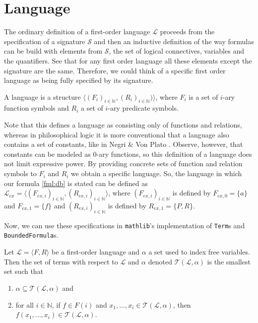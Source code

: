 \section{Language}\label{subsec:language}
The ordinary definition of a first-order language $\mathcal{L}$ proceeds from the specification of a signature $\mathcal{S}$ and then an inductive definition of the way formulas can be build with elements from $\mathcal{S}$, the set of logical connectives, variables and the quantifiers. See that for any first order language all these elements except the signature are the same. Therefore, we could think of a specific first order language as being fully specified by its signature.

\begin{definition}\label{def:FO-Language}
\leanok
  A language is a structure $\langle(F_i)_{i\in \mathbb{N}}, (R_i)_{i\in \mathbb{N}})\rangle$, where $F_i$ is a set of $i$-ary function symbols and $R_i$ a set of $i$-ary predicate symbols.
\end{definition}

Note that this defines a language as consisting only of functions and relations, whereas in philosophical logic it is more conventional that a language also contains a set of constants, like in Negri \& Von Plato \cite{negri:2001}. Observe, however, that constants can be modeled as $0$-ary functions, so this definition of a language does not limit expressive power. By providing concrete sets of function and relation symbols to $F_i$ and $R_i$ we obtain a specific language. So, the language in which our formula \ref{fml:db} is stated can be defined as $\mathcal{L}_{ex} = \langle (F_{ex,i})_{i \in \mathbb{N}}, (R_{ex,i})_{i \in \mathbb{N}} \rangle$, where $(F_{ex,i})_{i \in \mathbb{N}}$ is defined by $F_{ex,0} = \{a\}$ and $F_{ex,1} = \{f\}$ and $(R_{ex,i})_{i \in \mathbb{N}}$ is defined by $R_{ex,1} = \{P, R\}$.

Now, we can use these specifications in \texttt{mathlib}'s implementation of \texttt{Term}s and \texttt{BoundedFormula}s.

\begin{definition}\label{def:FO-Term}
  \leanok
    Let $\mathcal{L} = \langle F, R \rangle$ be a first-order language and $\alpha$ a set used to index free variables. Then the set of terms with respect to $\mathcal{L}$ and $\alpha$ denoted $\mathcal{T}(\mathcal{L},\alpha)$ is the smallest set such that
        \begin{enumerate}
            \item $\alpha \subseteq \mathcal{T}(\mathcal{L},\alpha)$ and
            \item for all $i \in \mathbb{N}$, if $f \in F(i)$ and $x_1,...,x_i \in \mathcal{T}(\mathcal{L},\alpha)$, then $f(x_1,...,x_i) \in \mathcal{T}(\mathcal{L},\alpha)$.
        \end{enumerate}
\end{definition}

